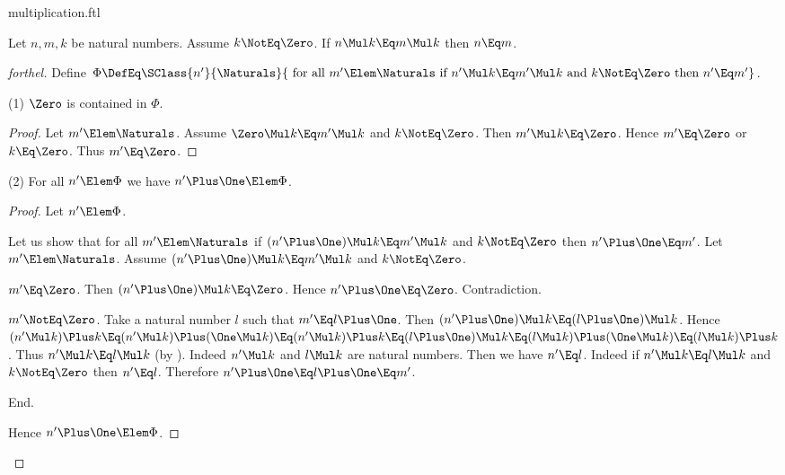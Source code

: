 \documentclass{stex}
\begin{document}
\begin{smodule}{multiplication.ftl}
\begin{proposition*}[forthel,name=right-cancellability of multiplication]
  Let $n, m, k$ be natural numbers.
  Assume $k \NotEq \Zero$.
  If $n \Mul k \Eq m \Mul k$ then $n \Eq m$.
\end{proposition*}
\begin{proof}[forthel]
  Define $\Phi \DefEq \SClass{n'}{\Naturals}{\text{ for all }m' \Elem \Naturals\text{ if }n' \Mul k \Eq m' \Mul k\text{ and }k \NotEq \Zero\text{ then }n' \Eq m'}$.

  (1) $\Zero$ is contained in $\Phi$.
  \begin{proof}
    Let $m' \Elem \Naturals$.
    Assume $\Zero \Mul k \Eq m' \Mul k$ and $k \NotEq \Zero$.
    Then $m' \Mul k \Eq \Zero$.
    Hence $m' \Eq \Zero$ or $k \Eq \Zero$.
    Thus $m' \Eq \Zero$.
  \end{proof}

  (2) For all $n' \Elem \Phi$ we have $n' \Plus \One \Elem \Phi$. 
  \begin{proof}
    Let $n' \Elem \Phi$.

    Let us show that for all $m' \Elem \Naturals$ if $(n' \Plus \One) \Mul k \Eq m' \Mul k$ and $k \NotEq \Zero$ then $n' \Plus \One \Eq m'$.
      Let $m' \Elem \Naturals$.
      Assume $(n' \Plus \One) \Mul k \Eq m' \Mul k$ and $k \NotEq \Zero$.

      \begin{case}{$m' \Eq \Zero$.}
        Then $(n' \Plus \One) \Mul k \Eq \Zero$.
        Hence $n' \Plus \One \Eq \Zero$.
        Contradiction.
      \end{case}

      \begin{case}{$m' \NotEq \Zero$.}
        Take a natural number $l$ such that $m' \Eq l \Plus \One$.
        Then $(n' \Plus \One) \Mul k \Eq (l \Plus \One) \Mul k$.
        Hence $(n' \Mul k) \Plus k
          \Eq (n' \Mul k) \Plus (\One \Mul k)
          \Eq (n' \Mul k) \Plus k
          \Eq (l \Plus \One) \Mul k
          \Eq (l \Mul k) \Plus (\One \Mul k)
          \Eq (l \Mul k) \Plus k$.
        Thus $n' \Mul k \Eq l \Mul k$ (by ).
        Indeed $n' \Mul k$ and $l \Mul k$ are natural numbers.
        Then we have $n' \Eq l$.
        Indeed if $n' \Mul k \Eq l \Mul k$ and $k \NotEq \Zero$ then $n' \Eq l$.
        Therefore $n' \Plus \One \Eq l \Plus \One \Eq m'$.
      \end{case}
    End.

    Hence $n' \Plus \One \Elem \Phi$.
  \end{proof}


\end{proof}
\end{smodule}
\end{document}
